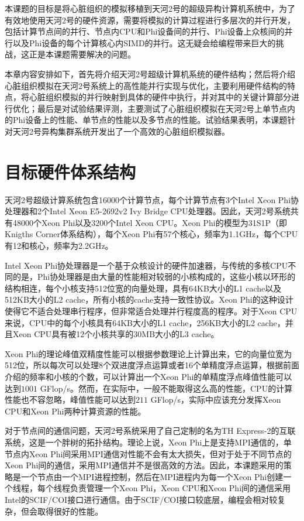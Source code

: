 本课题的目标是将心脏组织的模拟移植到天河2号的超级异构计算机系统中，为了有效地使用天河2号的硬件资源，需要将模拟的计算过程进行多层次的并行开发，包括计算节点间的并行、节点内CPU和Phi设备间的并行、Phi设备上众核间的并行以及Phi设备的每个计算核心内SIMD的并行。这无疑会给编程带来巨大的挑战，这正是本课题需要解决的问题。

本章内容安排如下，首先将介绍天河2号超级计算机系统的硬件结构；然后将介绍心脏组织模拟在天河2号系统上的高性能并行实现与优化，主要利用硬件结构的特点，将心脏组织模拟的并行映射到具体的硬件中执行，并对其中的关键计算部分进行优化；最后是对试验结果评测，主要测试了心脏组织模拟在天河2号上单节点内的Phi设备上的性能、单节点的性能以及多节点的性能。试验结果表明，本课题针对天河2号异构集群系统开发出了一个高效的心脏组织模拟器。

\section{目标硬件体系结构}

天河2号超级计算系统包含16000个计算节点，每个计算节点有3个Intel Xeon Phi协处理器和2个Intel Xeon E5-2692v2 Ivy Bridge CPU处理器。因此，天河2号系统共有48000个Xeon Phi以及3200个Intel Xeon CPU。Xeon Phi的模型为31S1P（即Knigths Corner体系结构），每个Xeon Phi有57个核心，频率为1.1GHz，每个CPU有12和核心，频率为2.2GHz。

Intel Xeon Phi协处理器是一个基于众核设计的硬件加速器，与传统的多核CPU不同的是，Phi协处理器是由大量的性能相对较弱的小核构成的，这些小核以环形的结构相连，每个小核支持512位宽的向量处理，具有64KB大小的L1 cache以及512KB大小的L2 cache，所有小核的cache支持一致性协议。Xeon Phi的这种设计使得它不适合处理串行程序，但非常适合处理并行程度高的程序。对于Xeon CPU来说，CPU中的每个小核具有64KB大小的L1 cache，256KB大小的L2 cache，并且Xeon CPU具有被12个小核共享的30MB大小的L3 cache。

Xeon Phi的理论峰值双精度性能可以根据参数理论上计算出来，它的向量位宽为512位，所以每次可以处理8个双进度浮点运算或者16个单精度浮点运算，根据前面介绍的频率和小核的个数，可以计算出一个Xeon Phi的单精度浮点峰值性能可以达到$1001$ GFlop/s。然而，在实际中，一般不能取得这么高的性能，CPU的计算性能也不容忽略，峰值性能可以达到$211$ GFlop/s，实际中应该充分发挥Xeon CPU和Xeon Phi两种计算资源的性能。

对于节点间的通信问题，天河2号系统采用了自己定制的名为TH Express-2的互联系统，这是一个胖树的拓扑结构。理论上说，Xeon Phi上是支持MPI通信的，单节点内Xeon Phi间采用MPI通信对性能不会有太大损失，但对于处于不同节点的Xeon Phi间的通信，采用MPI通信并不是很高效的方法。因此，本课题采用的策略是一个节点由一个MPI进程控制，然后在MPI进程内为每一个Xeon Phi创建一个线程，每个线程负责管理一个Xeon Phi，Xeon CPU和Xeon Phi间的通信采用Intel的SCIF/COI接口进行通信。由于SCIF/COI接口较底层，编程会相对较复杂，但会取得很好的性能。

